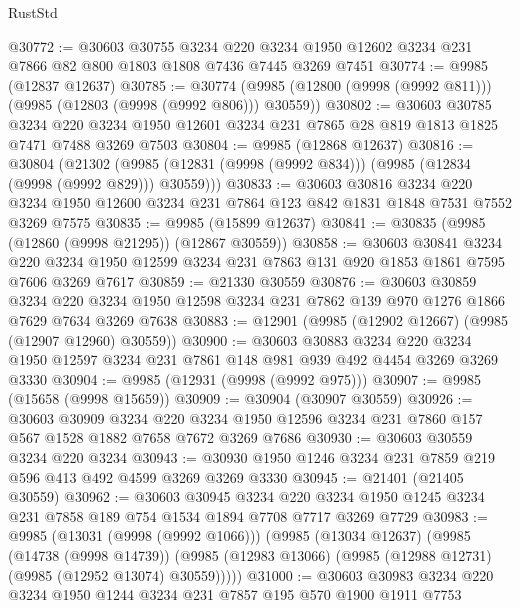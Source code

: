 \begin{lexlean}{RustStd}
\begin{coremodule}
@30772 := @30603
    @30755
    @3234
    @220
    @3234
    @1950
    @12602
    @3234
    @231
    @7866
    @82
    @800
    @1803
    @1808
    @7436
    @7445
    @3269
    @7451
@30774 := @9985 (@12837 @12637)
@30785 := @30774 (@9985 (@12800 (@9998 (@9992 @811))) (@9985 (@12803 (@9998 (@9992 @806))) @30559))
@30802 := @30603
    @30785
    @3234
    @220
    @3234
    @1950
    @12601
    @3234
    @231
    @7865
    @28
    @819
    @1813
    @1825
    @7471
    @7488
    @3269
    @7503
@30804 := @9985 (@12868 @12637)
@30816 := @30804
    (@21302 (@9985 (@12831 (@9998 (@9992 @834))) (@9985 (@12834 (@9998 (@9992 @829))) @30559)))
@30833 := @30603
    @30816
    @3234
    @220
    @3234
    @1950
    @12600
    @3234
    @231
    @7864
    @123
    @842
    @1831
    @1848
    @7531
    @7552
    @3269
    @7575
@30835 := @9985 (@15899 @12637)
@30841 := @30835 (@9985 (@12860 (@9998 @21295)) (@12867 @30559))
@30858 := @30603
    @30841
    @3234
    @220
    @3234
    @1950
    @12599
    @3234
    @231
    @7863
    @131
    @920
    @1853
    @1861
    @7595
    @7606
    @3269
    @7617
@30859 := @21330 @30559
@30876 := @30603
    @30859
    @3234
    @220
    @3234
    @1950
    @12598
    @3234
    @231
    @7862
    @139
    @970
    @1276
    @1866
    @7629
    @7634
    @3269
    @7638
@30883 := @12901 (@9985 (@12902 @12667) (@9985 (@12907 @12960) @30559))
@30900 := @30603
    @30883
    @3234
    @220
    @3234
    @1950
    @12597
    @3234
    @231
    @7861
    @148
    @981
    @939
    @492
    @4454
    @3269
    @3269
    @3330
@30904 := @9985 (@12931 (@9998 (@9992 @975)))
@30907 := @9985 (@15658 (@9998 @15659))
@30909 := @30904 (@30907 @30559)
@30926 := @30603
    @30909
    @3234
    @220
    @3234
    @1950
    @12596
    @3234
    @231
    @7860
    @157
    @567
    @1528
    @1882
    @7658
    @7672
    @3269
    @7686
@30930 := @30603 @30559 @3234 @220 @3234
@30943 := @30930 @1950 @1246 @3234 @231 @7859 @219 @596 @413 @492 @4599 @3269 @3269 @3330
@30945 := @21401 (@21405 @30559)
@30962 := @30603
    @30945
    @3234
    @220
    @3234
    @1950
    @1245
    @3234
    @231
    @7858
    @189
    @754
    @1534
    @1894
    @7708
    @7717
    @3269
    @7729
@30983 := @9985
    (@13031 (@9998 (@9992 @1066)))
    (@9985
      (@13034 @12637)
      (@9985
        (@14738 (@9998 @14739))
        (@9985 (@12983 @13066) (@9985 (@12988 @12731) (@9985 (@12952 @13074) @30559)))))
@31000 := @30603
    @30983
    @3234
    @220
    @3234
    @1950
    @1244
    @3234
    @231
    @7857
    @195
    @570
    @1900
    @1911
    @7753

\end{coremodule}
\end{lexlean}
